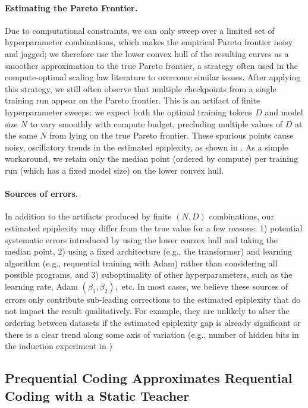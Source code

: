 \documentclass[twoside]{article}
\begin{document}
\paragraph{Estimating the Pareto Frontier.} Due to computational constraints, we can only sweep over a limited set of hyperparameter combinations, which makes the empirical Pareto frontier noisy and jagged; we therefore use the lower convex hull of the resulting curves as a smoother approximation to the true Pareto frontier, a strategy often used in the compute-optimal scaling law literature \citep{henighan2020scaling,mcleish2025gemstones} to overcome similar issues. After applying this strategy, we still often observe that multiple checkpoints from a single training run appear on the Pareto frontier. This is an artifact of finite hyperparameter sweeps: we expect both the optimal training tokens $D$ and model size $N$ to vary smoothly with compute budget, precluding multiple values of $D$ at the same $N$ from lying on the true Pareto frontier. These spurious points cause noisy, oscillatory trends in the estimated epiplexity, as shown in . As a simple workaround, we retain only the median point (ordered by compute) per training run (which has a fixed model size) on the lower convex hull.


\paragraph{Sources of errors.} In addition to the artifacts produced by finite $(N,D)$ combinations, our estimated epiplexity may differ from the true value for a few reasons: 1) potential systematic errors introduced by using the lower convex hull and taking the median point, 2) using a fixed architecture (e.g., the transformer) and learning algorithm (e.g., requential training with Adam) rather than considering all possible programs, and 3) suboptimality of other hyperparameters, such as the learning rate, Adam $(\beta_1,\beta_2),$ etc. In most cases, we believe these sources of errors only contribute sub-leading corrections to the estimated epiplexity that do not impact the result qualitatively. For example, they are unlikely to alter the ordering between datasets if the estimated epiplexity gap is already significant or there is a clear trend along some axis of variation (e.g., number of hidden bits in the induction experiment in )


\subsection{Prequential Coding Approximates Requential Coding with a Static Teacher} \label{app:preq-as-approx}
\end{document}
